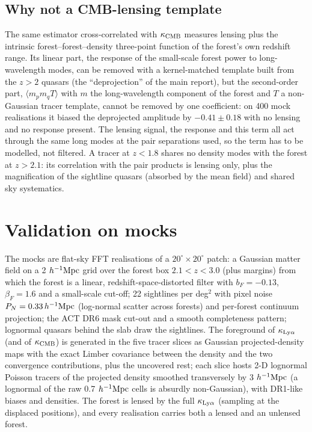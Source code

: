 \documentclass[11pt,a4paper]{article}
\newcommand{\kl}{\kappa_{{\rm Ly}\alpha}}
\newcommand{\kc}{\kappa_{\rm CMB}}
\newcommand{\Mpch}{\,h^{-1}{\rm Mpc}}
\begin{document}
\subsection{Why not a CMB-lensing template}
The same estimator cross-correlated with $\kc$ measures lensing plus the intrinsic forest--forest--density three-point function of the forest's own redshift range. Its linear part, the response of the small-scale forest power to long-wavelength modes, can be removed with a kernel-matched template built from the $z>2$ quasars (the ``deprojection'' of the main report), but the second-order part, $\langle m_pm_qT\rangle$ with $m$ the long-wavelength component of the forest and $T$ a non-Gaussian tracer template, cannot be removed by one coefficient: on 400 mock realisations it biased the deprojected amplitude by $-0.41\pm0.18$ with no lensing and no response present. The lensing signal, the response and this term all act through the same long modes at the pair separations used, so the term has to be modelled, not filtered. A tracer at $z<1.8$ shares no density modes with the forest at $z>2.1$: its correlation with the pair products is lensing only, plus the magnification of the sightline quasars (absorbed by the mean field) and shared sky systematics.

\section{Validation on mocks}
\label{sec:mock}
The mocks are flat-sky FFT realisations of a $20^\circ\times20^\circ$ patch: a Gaussian matter field on a 2\,$\Mpch$ grid over the forest box $2.1<z<3.0$ (plus margins) from which the forest is a linear, redshift-space-distorted filter with $b_F=-0.13$, $\beta_F=1.6$ and a small-scale cut-off; 22 sightlines per deg$^2$ with pixel noise $P_N=0.33\Mpch$ (log-normal scatter across forests) and per-forest continuum projection; the ACT DR6 mask cut-out and a smooth completeness pattern; lognormal quasars behind the slab draw the sightlines. The foreground of $\kl$ (and of $\kc$) is generated in the five tracer slices as Gaussian projected-density maps with the exact Limber covariance between the density and the two convergence contributions, plus the uncovered rest; each slice hosts 2-D lognormal Poisson tracers of the projected density smoothed transversely by 3\,$\Mpch$ (a lognormal of the raw 0.7\,$\Mpch$ cells is absurdly non-Gaussian), with DR1-like biases and densities. The forest is lensed by the full $\kl$ (sampling at the displaced positions), and every realisation carries both a lensed and an unlensed forest.
\end{document}
